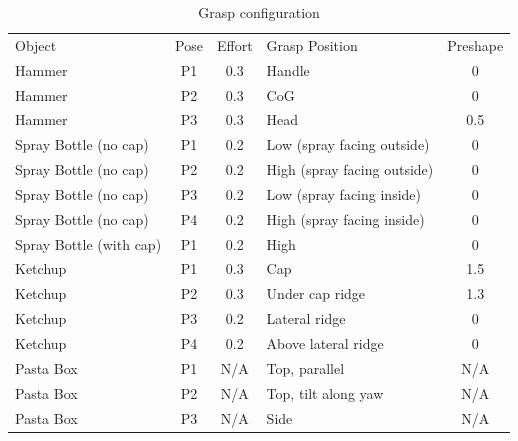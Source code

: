 \begin{table}[hbt]
   \begin{center}
   \begin{tabular}{| p{1.5cm}  | c | c | p{2.5cm} | c |}
   \hline
   Object   & Pose  & Effort &  Grasp Position  & Preshape \\
   \cline{1-5}
   Hammer					& P1   		&	0.3	& 	Handle	& 	0   \\\hline
   Hammer					& P2   		&	0.3	& 	CoG	& 	0   \\\hline
   Hammer					& P3   		&	0.3	& 	Head	& 	0.5 \\\hline
   Spray Bottle (no cap)	& P1   		&	0.2	&   Low (spray facing outside) 	&	0	\\\hline
   Spray Bottle (no cap)	& P2   		&	0.2	&   High  (spray facing outside)  	&	0	\\\hline
   Spray Bottle (no cap)	& P3   		&	0.2	&   Low (spray facing inside)  	&	0	\\\hline
   Spray Bottle (no cap)	& P4   		&	0.2	&   High (spray facing inside)    			&	0	\\\hline   
   Spray Bottle (with cap)	& P1   		&	0.2	&   High   	&	0	\\\hline
   Ketchup				& P1   		&	0.3	&   Cap   	&	1.5	\\\hline
   Ketchup				& P2   		&	0.3	&   Under cap ridge   	&	1.3	\\\hline
   Ketchup				& P3   		&	0.2	&   Lateral ridge   	&	0	\\\hline
   Ketchup				& P4   		&	0.2	&   Above lateral ridge   	&	0	\\\hline
   Pasta Box				& P1   		&	N/A	&   Top, parallel   	&   N/A	\\\hline
   Pasta Box				& P2   		&	N/A	&   Top, tilt along yaw   	&	N/A \\\hline
   Pasta Box				& P3   		&	N/A	&   Side   	&   N/A	\\\hline   
   
   \end{tabular}
   \end{center}
   \caption{Grasp configuration}
   \label{table:grasp}
\end{table}


